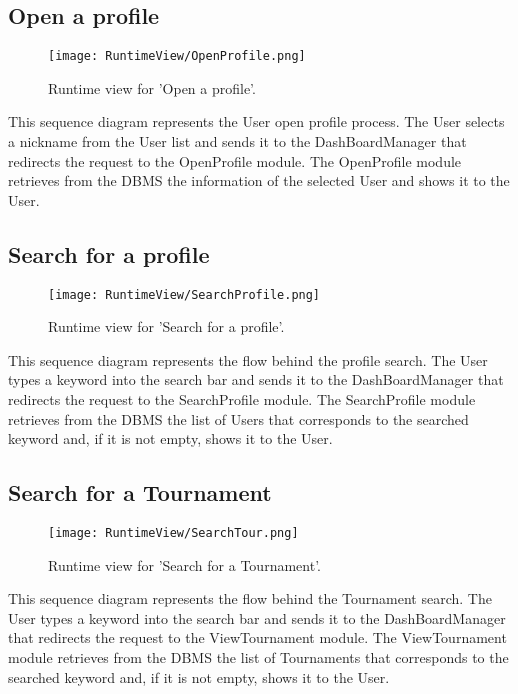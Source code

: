 \subsection{Open a profile}
\begin{figure}[H]
    \begin{center}
        \texttt{[image: RuntimeView/OpenProfile.png]}
        \caption{Runtime view for 'Open a profile'.}
        \label{fig:runtime_openprofile}%
    \end{center}
\end{figure}
This sequence diagram represents the User open profile process.
The User selects a nickname from the User list and sends it to the DashBoardManager that redirects the request to the OpenProfile module.
The OpenProfile module retrieves from the DBMS the information of the selected User and shows it to the User.


\subsection{Search for a profile}
\begin{figure}[H]
    \begin{center}
        \texttt{[image: RuntimeView/SearchProfile.png]}
        \caption{Runtime view for 'Search for a profile'.}
        \label{fig:runtime_searchprofile}%
    \end{center}
\end{figure}
This sequence diagram represents the flow behind the profile search.
The User types a keyword into the search bar and sends it to the DashBoardManager that redirects the request to the SearchProfile module.
The SearchProfile module retrieves from the DBMS the list of Users that corresponds to the searched keyword and, if it is not empty, shows it to the User.


\subsection{Search for a Tournament}
\begin{figure}[H]
    \begin{center}
        \texttt{[image: RuntimeView/SearchTour.png]}
        \caption{Runtime view for 'Search for a Tournament'.}
        \label{fig:runtime_searchtournament}%
    \end{center}
\end{figure}
This sequence diagram represents the flow behind the Tournament search.
The User types a keyword into the search bar and sends it to the DashBoardManager that redirects the request to the ViewTournament module.
The ViewTournament module retrieves from the DBMS the list of Tournaments that corresponds to the searched keyword and, if it is not empty, shows it to the User.

